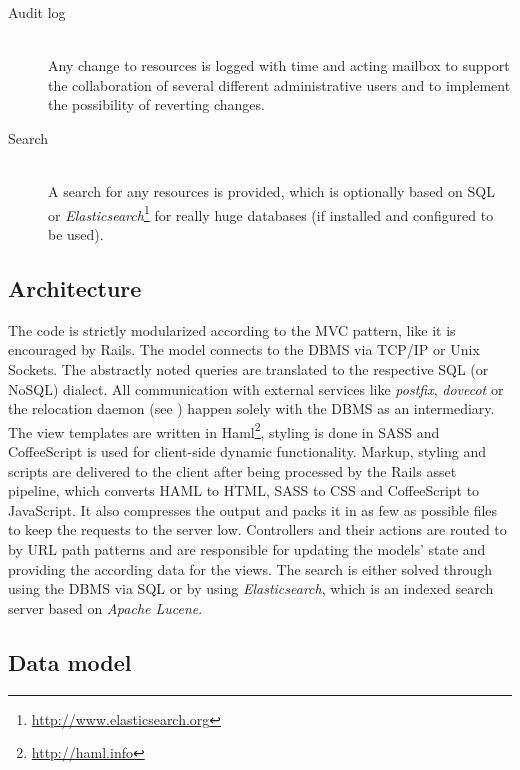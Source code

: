 \documentclass[12pt,a4paper]{scrartcl}
\begin{document}
\begin{description}
				\item[\rm Audit log]\ \\
					Any change to resources is logged with time and acting
					mailbox to support the collaboration of several different
					administrative users and to implement the possibility of
					reverting changes.

				\item[\rm Search]\ \\
					A search for any resources is provided, which is optionally
					based on \ac{SQL} or
					\emph{Elasticsearch}\footnote{\url{http://www.elasticsearch.org}}
					for really huge databases (if installed and configured to
					be used).
			\end{description}

		\subsection{Architecture}

			The code is strictly modularized according to the \ac{MVC} pattern,
			like it is encouraged by \ac{Rails}. The model connects to the
			\ac{DBMS} via TCP/IP or Unix Sockets. The abstractly noted queries
			are translated to the respective \ac{SQL} (or NoSQL) dialect. All
			communication with external services like \emph{postfix},
			\emph{dovecot} or the relocation daemon (see
			) happen solely with the
			\ac{DBMS} as an intermediary. The view templates are written in
			Haml\footnote{\url{http://haml.info}}, styling is done in SASS and
			CoffeeScript is used for client-side dynamic functionality. Markup,
			styling and scripts are delivered to the client after being
			processed by the \ac{Rails} asset pipeline, which converts HAML to
			HTML, SASS to CSS and CoffeeScript to JavaScript. It also
			compresses the output and packs it in as few as possible files to
			keep the requests to the server low. Controllers and their actions
			are routed to by URL path patterns and are responsible for updating
			the models' state and providing the according data for the views.
			The search is either solved through using the \ac{DBMS} via
			\ac{SQL} or by using \emph{Elasticsearch}, which is an indexed
			search server based on \emph{Apache Lucene}.

		\subsection{Data model}
\end{document}

